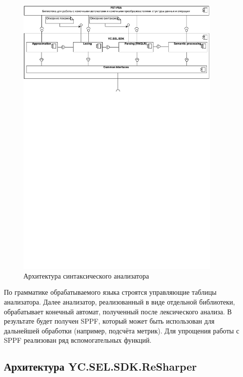 \begin{figure}[h!]
\begin{center}
\includegraphics[width=0.9\textwidth]{pics/Components}
\caption{Архитектура синтаксического анализатора}
\label{fig:ParsArch} 
\end{center}
\end{figure}

По грамматике обрабатываемого языка строятся управляющие таблицы анализатора. Далее анализатор, реализованный в виде отдельной библиотеки, обрабатывает конечный автомат, полученный после лексического анализа. В результате будет получен SPPF, который может быть использован для дальнейшей обработки (например, подсчёта метрик). Для упрощения работы с SPPF реализован ряд вспомогательных функций.

\subsection{Архитектура YC.SEL.SDK.ReSharper}

